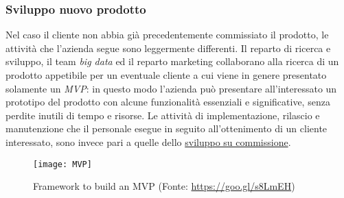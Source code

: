 \subsubsection{Sviluppo nuovo prodotto}
Nel caso il cliente non abbia già precedentemente commissiato il prodotto, le attività che l'azienda segue sono leggermente differenti. Il reparto di ricerca e sviluppo, il team \textit{big data} ed il reparto marketing collaborano alla ricerca di un prodotto appetibile per un eventuale cliente a cui viene in genere presentato solamente un \textit{\gls{MVP}}: in questo modo l'azienda può presentare all'interessato un prototipo del prodotto con alcune funzionalità essenziali e significative, senza perdite inutili di tempo e risorse. Le attività di implementazione, rilascio e manutenzione che il personale esegue in seguito all'ottenimento di un cliente interessato, sono invece pari a quelle dello \hyperref[commissione]{sviluppo su commissione}.
\begin{figure}[!h] 
	\centering 
	\texttt{[image: MVP]}
	\caption{Framework to build an MVP (Fonte: \href{https://goo.gl/s8LmEH}{https://goo.gl/s8LmEH})}
\end{figure}

